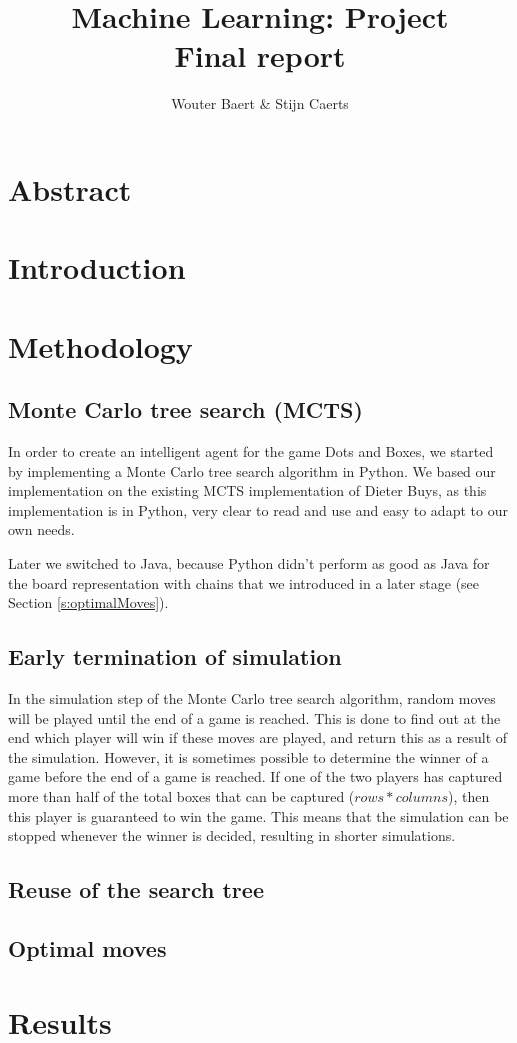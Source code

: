 \documentclass[11pt,a4paper,titlepage]{article}
\author{Wouter Baert \& Stijn Caerts}
\title{Machine Learning: Project \\ \small{Final report}}
\begin{document}
	\maketitle
	
	\section*{Abstract}
	
	\tableofcontents
	\newpage
	
	\section{Introduction}
	
	\section{Methodology}
	\subsection{Monte Carlo tree search (MCTS)}
	In order to create an intelligent agent for the game Dots and Boxes, we started by implementing a Monte Carlo tree search algorithm in Python. We based our implementation on the existing MCTS implementation of Dieter Buys\cite{DieterBuys:MCTS}, as this implementation is in Python, very clear to read and use and easy to adapt to our own needs.
	
	Later we switched to Java, because Python didn't perform as good as Java for the board representation with chains that we introduced in a later stage (see Section \ref{s:optimalMoves}).
	
	\subsection{Early termination of simulation}
	In the simulation step of the Monte Carlo tree search algorithm, random moves will be played until the end of a game is reached. This is done to find out at the end which player will win if these moves are played, and return this as a result of the simulation. However, it is sometimes possible to determine the winner of a game before the end of a game is reached. If one of the two players has captured more than half of the total boxes that can be captured ($rows * columns$), then this player is guaranteed to win the game. This means that the simulation can be stopped whenever the winner is decided, resulting in shorter simulations.
	
	\subsection{Reuse of the search tree}
	
	
	\subsection{Optimal moves\label{s:optimalMoves}}
	
	
	\section{Results}


	\newpage
	
	
\end{document}
